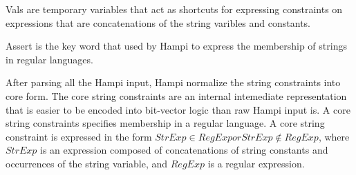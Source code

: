 Vals are temporary variables that act as shortcuts for expressing constraints on expressions that are concatenations of the string varibles and constants.

Assert is the key word that used by Hampi to express the membership of strings in regular languages.

After parsing all the Hampi input, Hampi normalize the string constraints into core form. The core string constraints are an internal intemediate representation that is easier to be encoded into bit-vector logic than raw Hampi input is. A core string constraints specifies membership in a regular language. A core string constraint is expressed in the form $StrExp\in RegExp or StrExp\notin RegExp$, where $StrExp$ is an expression composed of concatenations of string constants and occurrences of the string variable, and $RegExp$ is a regular expression.

